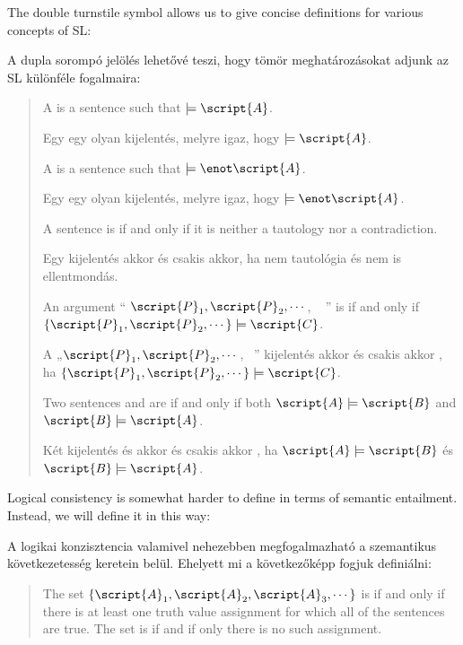 The double turnstile symbol allows us to give concise definitions for various concepts of SL:

A dupla sorompó jelölés lehetővé teszi, hogy tömör meghatározásokat adjunk az SL különféle fogalmaira:


\begin{quote}
A  is a sentence   such that $\models\script{A}$.

Egy  egy olyan  kijelentés, melyre igaz, hogy $\models\script{A}$.

A  is a sentence  such that $\models\enot\script{A}$.

Egy   egy olyan  kijelentés, melyre igaz, hogy $\models\enot\script{A}$.

A sentence is  if and only if it is neither a tautology nor a contradiction.

Egy kijelentés  akkor és csakis akkor, ha nem tautológia és nem is ellentmondás.

An argument `` $\script{P}_1, \script{P}_2, \cdots$, \therefore\  '' is  if and only if $\{\script{P}_1,\script{P}_2,\cdots\}\models\script{C}$.

A „$\script{P}_1, \script{P}_2, \cdots$, \therefore\ ” kijelentés akkor és csakis akkor , ha $\{\script{P}_1,\script{P}_2,\cdots\}\models\script{C}$.

Two sentences  and  are  if and only if both $\script{A}\models\script{B}$ and $\script{B}\models\script{A}$.

Két kijelentés  és  akkor és csakis akkor , ha $\script{A}\models\script{B}$ és $\script{B}\models\script{A}$.
\end{quote}

Logical consistency is somewhat harder to define in terms of semantic entailment. Instead, we will define it in this way:

A logikai konzisztencia valamivel nehezebben megfogalmazható a szemantikus következetesség keretein belül. Ehelyett mi a következőképp fogjuk definiálni:

\begin{quote}
\label{def.consistencySL}
The set $\{\script{A}_1,\script{A}_2,\script{A}_3,\cdots\}$ is  if and only if there is at least one truth value assignment for which all of the sentences are true. The set is  if and if only there is no such assignment.
\end{quote}


